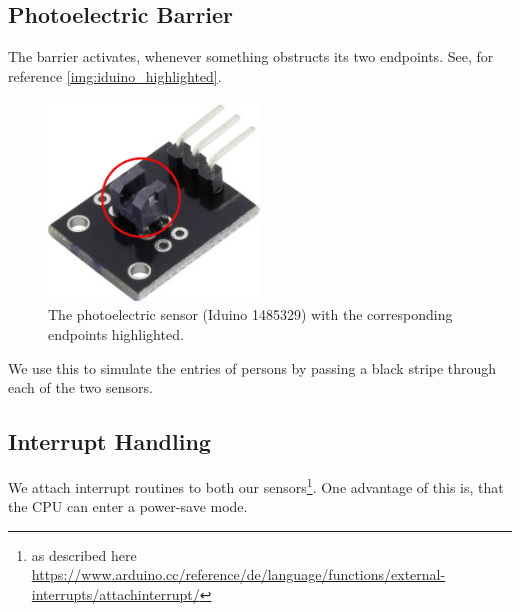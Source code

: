 \documentclass[]{article}
\begin{document}
\begin{sloppypar}
\subsection{Photoelectric Barrier}
The barrier activates, whenever something obstructs its two endpoints. See, for reference \eqref{img:iduino_highlighted}.\\
\begin{figure}
	\centering
	\includegraphics[width=0.5\textwidth, keepaspectratio]{./images/iduino_highlighted.png}
	\caption{The photoelectric sensor (Iduino 1485329) with the corresponding endpoints highlighted.}\label{img:iduino_highlighted}
\end{figure}	
We use this to simulate the entries of persons by passing a black stripe through each of the two sensors.
\subsection{Interrupt Handling}
We attach interrupt routines to both our sensors\footnote{as described here \url{https://www.arduino.cc/reference/de/language/functions/external-interrupts/attachinterrupt/}}. One advantage of this is, that the CPU can enter a power-save mode.
\newpage
\printbibliography

\end{sloppypar}
\end{document}
